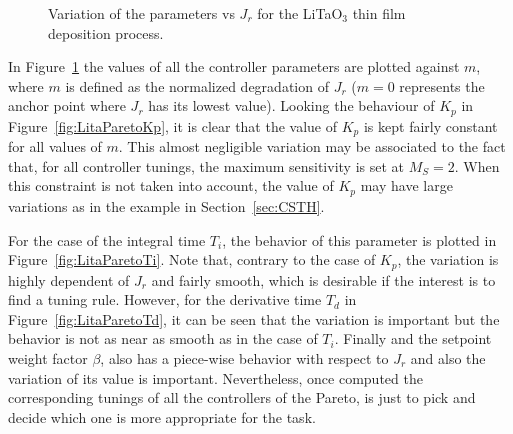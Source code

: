 \begin{figure}[tb]
{		
		\label{fig:LitaParetoBeta}	
	}
	\caption{Variation of the parameters vs $J_r$ for the  LiTaO$_3$ thin film deposition process.}
	\label{fig:LitaParetoParam}
\end{figure}
%

In Figure~\ref{fig:LitaParetoParam} the values of all the controller parameters are plotted against $m$, where $m$ is defined as the normalized degradation of $J_{r}$ ($m=0$ represents the anchor point where $J_r$ has its lowest value). Looking the behaviour of $K_p$ in Figure~\ref{fig:LitaParetoKp}, it is clear that the value of $K_p$ is kept fairly constant for all values of $m$. This almost negligible variation may be associated to the fact that, for all controller tunings, the maximum sensitivity is set at $M_S = 2$. When this constraint is not taken into account, the value of $K_p$ may have large variations as in the example in Section~\ref{sec:CSTH}.

For the case of the integral time $T_i$, the behavior of this parameter is plotted in Figure~\ref{fig:LitaParetoTi}. Note that, contrary to the case of $K_p$, the variation is highly dependent of $J_r$ and fairly smooth, which is desirable if the interest is to find a tuning rule. However, for the derivative time $T_d$ in Figure~\ref{fig:LitaParetoTd}, it can be seen that the variation is important but the behavior is not as near as smooth as in the case of $T_i$. Finally and the setpoint weight factor $\beta$, also has a piece-wise behavior with respect to $J_r$ and also the variation of its value is important. Nevertheless, once computed the corresponding tunings of all the controllers of the Pareto, is just to pick and decide which one is more appropriate for the task.

